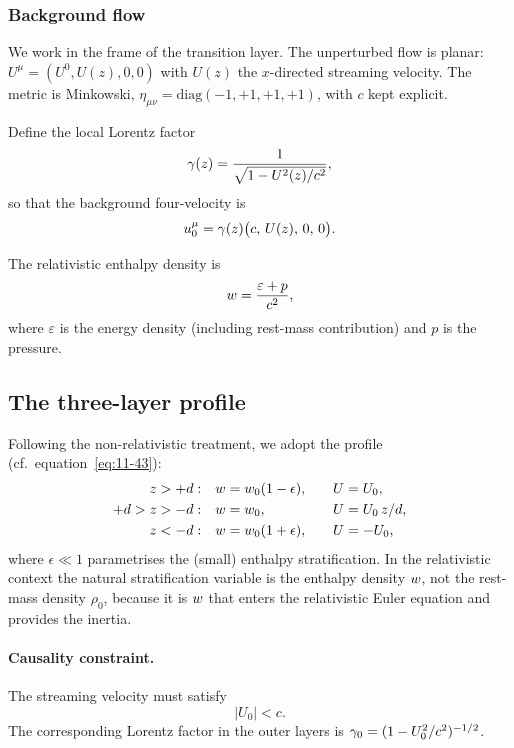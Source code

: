 \subsubsection{Background flow}
We work in the frame of the transition layer.  The unperturbed flow is
planar: $U^{\mu}=(U^{0},U(z),0,0)$ with $U(z)$ the $x$-directed
streaming velocity.  The metric is Minkowski, $\eta_{\mu\nu}=
\mathrm{diag}(-1,+1,+1,+1)$, with $c$ kept explicit.

Define the local Lorentz factor
\begin{equation}
\label{eq:rel-11-102-1}
\gamma(z) = \frac{1}{\sqrt{1-U^{2}(z)/c^{2}}},
\end{equation}
so that the background four-velocity is
\begin{equation}
\label{eq:rel-11-102-2}
u^{\mu}_{0} = \gamma(z)\bigl(c,\,U(z),\,0,\,0\bigr).
\end{equation}

The relativistic enthalpy density is
\begin{equation}
\label{eq:rel-11-102-3}
w = \frac{\varepsilon + p}{c^{2}},
\end{equation}
where $\varepsilon$ is the energy density (including rest-mass
contribution) and $p$ is the pressure.

\subsection{The three-layer profile}

Following the non-relativistic treatment, we adopt the profile
(cf.\ equation~\eqref{eq:11-43}):
\begin{equation}
\label{eq:rel-11-4}
\begin{aligned}
z > +d: &\quad w = w_{0}(1-\epsilon),
  &\quad U &= U_{0}, \\
+d > z > -d: &\quad w = w_{0},
  &\quad U &= U_{0}\,z/d, \\
z < -d: &\quad w = w_{0}(1+\epsilon),
  &\quad U &= -U_{0},
\end{aligned}
\end{equation}
where $\epsilon\ll 1$ parametrises the (small) enthalpy stratification.
In the relativistic context the natural stratification variable is the
enthalpy density $w$, not the rest-mass density $\rho_{0}$,
because it is $w$ that enters the relativistic Euler equation
and provides the inertia.

\paragraph{Causality constraint.}  The streaming velocity must satisfy
\begin{equation}
\label{eq:rel-11-5}
\boxed{|U_{0}| < c.}
\end{equation}
The corresponding Lorentz factor in the outer layers is
$\gamma_{0}=(1-U_{0}^{2}/c^{2})^{-1/2}$.

